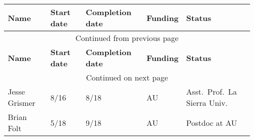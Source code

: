 {\sffamily\small
{}
\begin{longtable}[l]{ p{1.2in} p{0.5in} p{0.7in} p{0.7in} p{2.5in} }
    \hline
    \textbf{Name} & \textbf{Start date} & \textbf{Completion date} & \textbf{Funding} & \textbf{Status} \\
    \hline
    \endfirsthead
    \multicolumn{5}{c}{{Continued from previous page}} \\
    \hline
    \textbf{Name} & \textbf{Start date} & \textbf{Completion date} & \textbf{Funding} & \textbf{Status} \\
    \hline
    \endhead
    \hline \multicolumn{5}{c}{{Continued on next page}} \\
    \endfoot
    \hline
    \endlastfoot
    Jesse Grismer & 8/16 & 8/18 & AU & Asst.\ Prof.\, La Sierra Univ. \\
    Brian Folt & 5/18 & 9/18 & AU & Postdoc at AU \\
\end{longtable}
}
